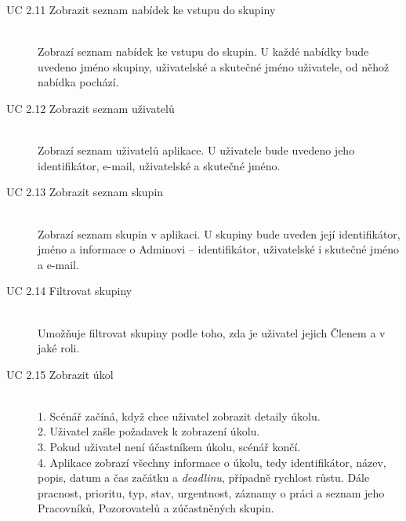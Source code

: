 \documentclass[thesis=B,czech]{FITthesis}[2012/06/26]
\begin{document}
\begin{description}
				\item[UC 2.11 Zobrazit seznam nabídek ke vstupu do skupiny] \hfill \\
					Zobrazí seznam nabídek ke vstupu do skupin. U každé nabídky bude uvedeno jméno skupiny, uživatelské a skutečné jméno uživatele, od něhož nabídka pochází.
				
				\item[UC 2.12 Zobrazit seznam uživatelů] \hfill \\
					Zobrazí seznam uživatelů aplikace. U uživatele bude uvedeno jeho identifikátor, e-mail, uživatelské a skutečné jméno.
					
				\item[UC 2.13 Zobrazit seznam skupin] \hfill \\
					Zobrazí seznam skupin v aplikaci. U skupiny bude uveden její identifikátor, jméno a informace o Adminovi -- identifikátor, uživatelské i skutečné jméno a e-mail.
					
				\item[UC 2.14 Filtrovat skupiny] \hfill \\
					Umožňuje filtrovat skupiny podle toho, zda je uživatel jejich Členem a v jaké roli.
					
				\item[UC 2.15 Zobrazit úkol] \hfill \\
					1. Scénář začíná, když chce uživatel zobrazit detaily úkolu. \\
					2. Uživatel zašle požadavek k zobrazení úkolu. \\
					3. Pokud uživatel není účastníkem úkolu, scénář končí.  \\
					4. Aplikace zobrazí všechny informace o úkolu, tedy identifikátor, název, popis, datum a čas začátku a \textit{deadlinu}, případně rychlost růstu. Dále pracnost, prioritu, typ, stav, urgentnost, záznamy o práci a seznam jeho Pracovníků, Pozorovatelů a zúčastněných skupin. \\
					

\end{description}
\end{document}
